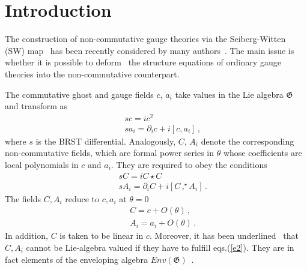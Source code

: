 \documentclass[a4paper,12pt]{article}
\newcommand{\starcomm}[2]{[ #1 \, ,^{\!\!\star} #2 ]}
\begin{document}
\newpage

\section{Introduction}

The construction of non-commutative gauge theories via the Seiberg-Witten (SW)
 map~\cite{Seiberg:1999vs} has been recently considered  by many
 authors~\cite{Asakawa:1999cu,Okuyama:2001sw,Jurco:2001rq,Brace:2001fj,Barnich:2001mc}.
The main issue is whether it is possible to
 deform~\cite{Jurco:2001rq,Brace:2001fj} the structure equations of ordinary
 gauge theories into the non-commutative counterpart. 

The commutative ghost and gauge fields $c$, $a_i$ take values in the Lie
 algebra $\mathfrak{G}$ and transform as 
%
\begin{subequations}\label{e1}
\begin{eqnarray}
&& s c = i c^2 \\
&& s a_i = \partial_i c + i [c, a_i] \,,
\end{eqnarray} 
\end{subequations}
%
where $s$ is the BRST differential. Analogously, $C$, $A_i$ denote the
 corresponding non-commutative fields, which are formal power series in 
 $\theta$ whose coefficients are local polynomials in  $c$ and $a_i$.
They are required to obey the conditions~\cite{Brace:2001fj} 
%
\begin{subequations}\label{e2}
\begin{eqnarray}
&& s C = i C \star C \\
&& s A_i = \partial_i C + i \starcomm{C}{A_i} \, .\label{e2:3}
\end{eqnarray}
\end{subequations}
%
The fields $C,A_i$ reduce to $c,a_i$ at $\theta=0$
%
\begin{subequations}\label{e4}
\begin{eqnarray}
&& C = c + O(\theta) \, , \label{e4:1}\\
&& A_i = a_i + O(\theta) \, .
\end{eqnarray}
\end{subequations}
%
In addition, $C$ is taken to be linear in $c$.
Moreover, it has been underlined~\cite{Jurco:2001rq} that $C, A_i$ 
 cannot be Lie-algebra valued if they have to fulfill eqs.(\ref{e2}).
They are  in fact elements of the enveloping algebra
 $Env(\mathfrak{G})$~\cite{Jurco:2001rq}.
\end{document}
